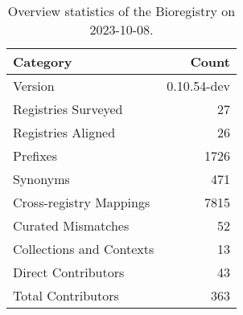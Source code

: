 \begin{table}
\caption{Overview statistics of the Bioregistry on 2023-10-08.}
\label{tab:bioregistry-summary}
\begin{tabular}{lr}
\toprule
Category & Count \\
\midrule
Version & 0.10.54-dev \\
Registries Surveyed & 27 \\
Registries Aligned & 26 \\
Prefixes & 1726 \\
Synonyms & 471 \\
Cross-registry Mappings & 7815 \\
Curated Mismatches & 52 \\
Collections and Contexts & 13 \\
Direct Contributors & 43 \\
Total Contributors & 363 \\
\bottomrule
\end{tabular}
\end{table}

